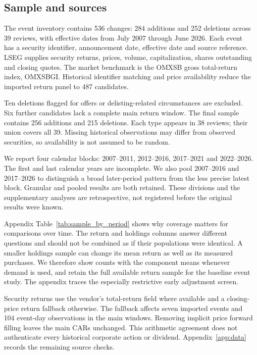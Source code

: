 \subsection{Sample and sources}

The event inventory contains 536 changes: 284 additions and 252 deletions across 39 reviews, with effective dates from July 2007 through June 2026. Each event has a security identifier, announcement date, effective date and source reference. LSEG supplies security returns, prices, volume, capitalization, shares outstanding and closing quotes. The market benchmark is the OMXSB gross total-return index, OMXSBGI. Historical identifier matching and price availability reduce the imported return panel to 487 candidates.



Ten deletions flagged for offers or delisting-related circumstances are excluded. Six further candidates lack a complete main return window. The final sample contains 256 additions and 215 deletions. Each type appears in 38 reviews; their union covers all 39. Missing historical observations may differ from observed securities, so availability is not assumed to be random.

We report four calendar blocks: 2007--2011, 2012--2016, 2017--2021 and 2022--2026. The first and last calendar years are incomplete. We also pool 2007--2016 and 2017--2026 to distinguish a broad later-period pattern from the less precise latest block. Granular and pooled results are both retained. These divisions and the supplementary analyses are retrospective, not registered before the original results were known.

Appendix Table~\ref{tab:sample_by_period} shows why coverage matters for comparisons over time. The return and holdings columns answer different questions and should not be combined as if their populations were identical. A smaller holdings sample can change its mean return as well as its measured purchases. We therefore show counts with the component means whenever demand is used, and retain the full available return sample for the baseline event study. The appendix traces the especially restrictive early adjustment screen.

Security returns use the vendor's total-return field where available and a closing-price return fallback otherwise. The fallback affects seven imported events and 104 event-day observations in the main windows. Removing implicit price forward filling leaves the main CARs unchanged. This arithmetic agreement does not authenticate every historical corporate action or dividend. Appendix~\ref{app:data} records the remaining source checks.


